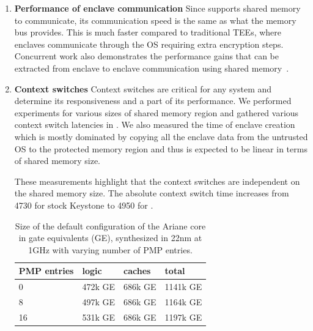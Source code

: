 \begin{enumerate}
\item \textbf{Performance of enclave communication}
Since \name{} supports shared memory to communicate, its communication speed is the same as what the memory bus provides. This is much faster compared to traditional TEEs, where enclaves communicate through the OS requiring extra encryption steps. Concurrent work also demonstrates the performance gains that can be extracted from enclave to enclave communication using shared memory~\cite{yu2020elasticlave}.


\item \textbf{Context switches}
Context switches are critical for any system and determine its responsiveness and a part of its performance.
We performed experiments for various sizes of shared memory region and gathered various context switch latencies in . We also measured the time of enclave creation which is mostly dominated by copying all the enclave data from the untrusted OS to the protected memory region and thus is expected to be linear in terms of shared memory size. 

These measurements highlight that the context switches are independent on the shared memory size. The absolute context switch time increases from 4730 for stock Keystone to 4950 for \name{}.

\begin{table}[tbp]
    \centering
    \caption{Size of the default configuration of the Ariane core in gate equivalents (GE), synthesized in 22nm at 1GHz with varying number of PMP entries.}\vspace{-0.5em}
    \begin{tabular}{llll}\toprule
        PMP entries & logic & caches & total \\\midrule
        0 & 472k GE & 686k GE & 1141k GE \\
        8 & 497k GE & 686k GE & 1164k GE \\
        16 & 531k GE & 686k GE & 1197k GE \\ \bottomrule
    \end{tabular}
    

\end{table}
\end{enumerate}
